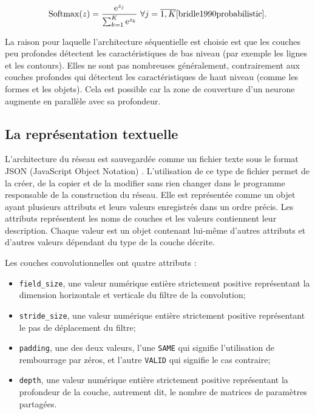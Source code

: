 $$
\mathrm{Softmax}(z) = \frac{\mathrm{e}^{z_j}}{\sum^K_{k=1}\mathrm{e}^{z_k}}~\forall{j=\overline{1,K}} \cite{bridle1990probabilistic}.
$$

La raison pour laquelle l'architecture séquentielle est choisie est que les
couches peu profondes détectent
les caractéristiques de bas niveau (par exemple les lignes et les contours). Elles
ne sont pas nombreuses généralement, contrairement aux couches profondes qui détectent
les caractéristiques de haut niveau (comme les formes et les objets).
Cela est possible car la zone de couverture d'un neurone
augmente en parallèle avec sa profondeur.\cite{michael2015neural,Goodfellow-et-al-2016}

\subsection{La représentation textuelle}

L'architecture du réseau est sauvegardée comme un fichier texte sous le format
JSON (JavaScript Object Notation) \cite{introducing2012ecma}.
L'utilisation de ce type de fichier
permet de la créer, de la copier et de la modifier sans rien changer dans le
programme responsable de la construction du réseau. Elle est représentée comme un objet
ayant plusieurs attributs et leurs valeurs enregistrés dans un ordre précis.
Les attributs représentent les noms de couches et les valeurs contiennent
leur description. Chaque valeur est un objet contenant lui-même d'autres attributs
et d'autres valeurs dépendant du type de la couche décrite.

Les couches convolutionnelles ont quatre attributs :

\begin{itemize}
  \item \texttt{field\_size}, une valeur numérique entière strictement positive
  représentant la dimension horizontale et verticale du filtre de la convolution;
  \item \texttt{stride\_size}, une valeur numérique entière strictement positive
  représentant le pas de déplacement du filtre;
  \item \texttt{padding}, une des deux valeurs, l'une \texttt{SAME} qui signifie
  l'utilisation de rembourrage par zéros, et l'autre \texttt{VALID} qui signifie le cas
  contraire;
  \item \texttt{depth}, une valeur numérique entière strictement positive représentant
  la profondeur de la couche, autrement dit, le nombre de matrices de paramètres
  partagées.
\end{itemize}

